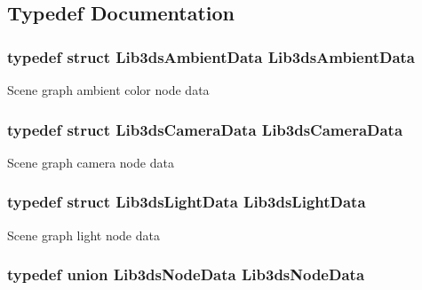 \subsection{Typedef Documentation}
\hypertarget{group__node_ga0d4a868adad3cf3cb561467289bbbce9}{
\subsubsection[{Lib3ds\-Ambient\-Data}]{\setlength{\rightskip}{0pt plus 5cm}typedef {\bf struct} {\bf Lib3ds\-Ambient\-Data}  {\bf Lib3ds\-Ambient\-Data}}}\label{group__node_ga0d4a868adad3cf3cb561467289bbbce9}
Scene graph ambient color node data \hypertarget{group__node_gaeb1879e7cbea3578f93707d1aff7bf84}{
\subsubsection[{Lib3ds\-Camera\-Data}]{\setlength{\rightskip}{0pt plus 5cm}typedef {\bf struct} {\bf Lib3ds\-Camera\-Data}  {\bf Lib3ds\-Camera\-Data}}}\label{group__node_gaeb1879e7cbea3578f93707d1aff7bf84}
Scene graph camera node data \hypertarget{group__node_gafa635d55f560f9124cb51e9326d9aa0b}{
\subsubsection[{Lib3ds\-Light\-Data}]{\setlength{\rightskip}{0pt plus 5cm}typedef {\bf struct} {\bf Lib3ds\-Light\-Data}  {\bf Lib3ds\-Light\-Data}}}\label{group__node_gafa635d55f560f9124cb51e9326d9aa0b}
Scene graph light node data \hypertarget{group__node_ga1eab7eee2c1297ea7f5491872dff9fd3}{
\subsubsection[{Lib3ds\-Node\-Data}]{\setlength{\rightskip}{0pt plus 5cm}typedef {\bf union} {\bf Lib3ds\-Node\-Data}  {\bf Lib3ds\-Node\-Data}}}\label{group__node_ga1eab7eee2c1297ea7f5491872dff9fd3}
